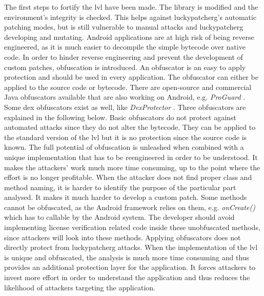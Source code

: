 The first steps to fortify the \gls{lvl} have been made.
The library is modified and the environment's integrity is checked.
This helps against \gls{luckypatcherg}'s automatic patching modes, but is still vulnerable to manual attacks and \gls{luckypatcherg} developing and mutating.
Android applications are at high risk of being reverse engineered, as it is much easier to decompile the simple bytecode over native code.
In order to hinder reverse engineering and prevent the development of custom patches, obfuscation is introduced.
\newline
An obfuscator is an easy to apply protection and should be used in every application.
The obfuscator can either be applied to the source code or bytecode.
There are open-source and commercial Java obfuscators available that are also working on Android, e.g. \textit{ProGuard} \cite{proguard}.
Some dex obfuscators exist as well, like \textit{DexProtector} \cite{dexProtector}.
Three obfuscators are explained in the following below.
\newline
Basic obfuscators do not protect against automated attacks since they do not alter the bytecode.
They can be applied to the standard version of the \gls{lvl} but it is no protection since the source code is known.
The full potential of obfuscation is unleashed when combined with a unique implementation that has to be reengineered in order to be understood.
It makes the attackers' work much more time consuming, up to the point where the effort is no longer profitable.
When the attacker does not find proper class and method naming, it is harder to identify the purpose of the particular part analysed.
It makes it much harder to develop a custom patch. \cite{developersSecuring}
\newline
Some methods cannot be obfuscated, as the Android framework relies on them, e.g. \textit{onCreate()} which has to callable by the Android system.
The developer should avoid implementing license verification related code inside these unobfuscated methods, since attackers will look into these methods.
\cite{developersSecuring}
\newline
\newline
Applying obfuscators does not directly protect from \gls{luckypatcherg} attacks.
When the implementation of the \gls{lvl} is unique and obfuscated, the analysis is much more time consuming and thus provides an additional protection layer for the application.
It forces attackers to invest more effort in order to understand the application and thus reduces the likelihood of attackers targeting the application.
